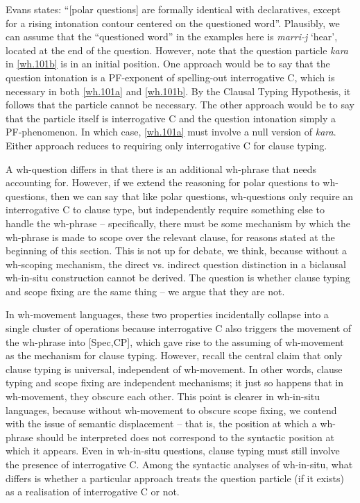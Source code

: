 \documentclass[charis]{glossa}
\begin{document}
Evans states: ``[polar questions] are formally identical with declaratives, except for a rising intonation contour centered on the questioned word''. Plausibly, we can assume that the ``questioned word'' in the examples here is \textit{marri-j} `hear', located at the end of the question. However, note that the question particle \textit{kara} in \ref{wh.101b} is in an initial position. One approach would be to say that the question intonation is a PF-exponent of spelling-out interrogative C, which is necessary in both \ref{wh.101a} and \ref{wh.101b}. By the Clausal Typing Hypothesis, it follows that the particle cannot be necessary. The other approach would be to say that the particle itself is interrogative C and the question intonation simply a PF-phenomenon. In which case, \ref{wh.101a} must involve a null version of \textit{kara}. Either approach reduces to requiring only interrogative C for clause typing.

A wh-question differs in that there is an additional wh-phrase that needs accounting for. However, if we extend the reasoning for polar questions to wh-questions, then we can say that like polar questions, wh-questions only require an interrogative C to clause type, but independently require something else to handle the wh-phrase -- specifically, there must be some mechanism by which the wh-phrase is made to scope over the relevant clause, for reasons stated at the beginning of this section. This is not up for debate, we think, because without a wh-scoping mechanism, the direct vs. indirect question distinction in a biclausal wh-in-situ construction cannot be derived. The question is whether clause typing and scope fixing are the same thing -- we argue that they are not.

In wh-movement languages, these two properties incidentally collapse into a single cluster of operations because interrogative C also triggers the movement of the wh-phrase into [Spec,CP], which gave rise to the assuming of wh-movement as the mechanism for clause typing. However, recall the central claim that only clause typing is universal, independent of wh-movement. In other words, clause typing and scope fixing are independent mechanisms; it just so happens that in wh-movement, they obscure each other. This point is clearer in wh-in-situ languages, because without wh-movement to obscure scope fixing, we contend with the issue of semantic displacement -- that is, the position at which a wh-phrase should be interpreted does not correspond to the syntactic position at which it appears. Even in wh-in-situ questions, clause typing must still involve the presence of interrogative C. Among the syntactic analyses of wh-in-situ, what differs is whether a particular approach treats the question particle (if it exists) as a realisation of interrogative C or not.
\end{document}
